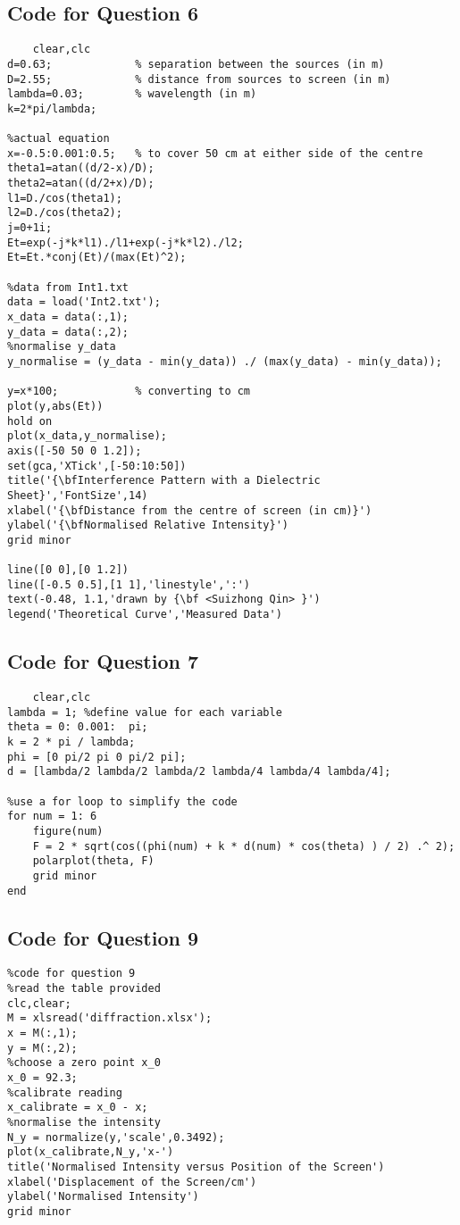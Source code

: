 \documentclass[12pt]{article}
\begin{document}
    \newpage
    \subsection{Code for Question 6}
    \begin{lstlisting}
    clear,clc
d=0.63;             % separation between the sources (in m)
D=2.55;             % distance from sources to screen (in m)
lambda=0.03;        % wavelength (in m)
k=2*pi/lambda;

%actual equation
x=-0.5:0.001:0.5;   % to cover 50 cm at either side of the centre
theta1=atan((d/2-x)/D);
theta2=atan((d/2+x)/D);
l1=D./cos(theta1);
l2=D./cos(theta2);
j=0+1i;
Et=exp(-j*k*l1)./l1+exp(-j*k*l2)./l2;
Et=Et.*conj(Et)/(max(Et)^2);

%data from Int1.txt
data = load('Int2.txt');
x_data = data(:,1);
y_data = data(:,2);
%normalise y_data
y_normalise = (y_data - min(y_data)) ./ (max(y_data) - min(y_data));

y=x*100;            % converting to cm
plot(y,abs(Et))
hold on
plot(x_data,y_normalise);
axis([-50 50 0 1.2]);
set(gca,'XTick',[-50:10:50])
title('{\bfInterference Pattern with a Dielectric Sheet}','FontSize',14)
xlabel('{\bfDistance from the centre of screen (in cm)}')
ylabel('{\bfNormalised Relative Intensity}')
grid minor

line([0 0],[0 1.2])
line([-0.5 0.5],[1 1],'linestyle',':')
text(-0.48, 1.1,'drawn by {\bf <Suizhong Qin> }')
legend('Theoretical Curve','Measured Data')
    \end{lstlisting}
    
    \newpage
    \subsection{Code for Question 7}
    \begin{lstlisting}
    clear,clc
lambda = 1; %define value for each variable
theta = 0: 0.001:  pi;
k = 2 * pi / lambda;
phi = [0 pi/2 pi 0 pi/2 pi];
d = [lambda/2 lambda/2 lambda/2 lambda/4 lambda/4 lambda/4];

%use a for loop to simplify the code
for num = 1: 6
    figure(num)
    F = 2 * sqrt(cos((phi(num) + k * d(num) * cos(theta) ) / 2) .^ 2);
    polarplot(theta, F)
    grid minor
end
    \end{lstlisting}
    
    \subsection{Code for Question 9}
    \begin{lstlisting}
%code for question 9
%read the table provided
clc,clear;
M = xlsread('diffraction.xlsx');
x = M(:,1);
y = M(:,2);
%choose a zero point x_0
x_0 = 92.3;
%calibrate reading
x_calibrate = x_0 - x;
%normalise the intensity
N_y = normalize(y,'scale',0.3492);
plot(x_calibrate,N_y,'x-')
title('Normalised Intensity versus Position of the Screen')
xlabel('Displacement of the Screen/cm')
ylabel('Normalised Intensity')
grid minor
    \end{lstlisting}
    \newpage 
\end{document}
